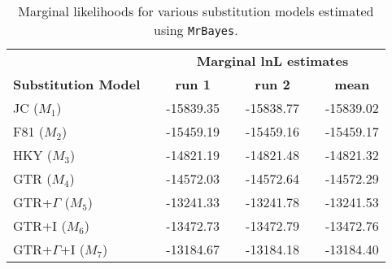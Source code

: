 %
\newpage
\begin{Form}
\begin{table}[h]
\centering
\caption{\small Marginal likelihoods for various substitution models estimated using \texttt{MrBayes}.}
\begin{tabular}{l c c c c c c}
\hline
\multicolumn{1}{l}{\textbf{ }} &\multicolumn{1}{r}{\textbf{ }} & \multicolumn{5}{c}{\textbf{Marginal lnL estimates}} \\ 
\cline{3-7}
\multicolumn{1}{l}{\textbf{Substitution Model}} & \multicolumn{1}{r}{\hspace{3mm}} & \multicolumn{1}{c}{\textbf{run 1}} & \multicolumn{1}{r}{\hspace{3mm}} & \multicolumn{1}{c}{\textbf{run 2}} & \multicolumn{1}{r}{\hspace{3mm}} & \multicolumn{1}{c}{\textbf{mean}} \\ 
\hline
JC ($M_1$) & \hspace{15mm} 					&-15839.35  		& \hspace{3mm} & -15838.77  		& \hspace{3mm} & -15839.02\\
\hline
F81 ($M_2$) & \hspace{15mm} 				& -15459.19   		& \hspace{3mm} & -15459.16 			& \hspace{3mm} &  -15459.17\\
\hline
HKY ($M_3$) & \hspace{15mm} 				&  -14821.19 		& \hspace{3mm} &  -14821.48  		& \hspace{3mm} & -14821.32 \\
\hline
GTR ($M_4$) & \hspace{15mm} 				& -14572.03  		& \hspace{3mm} &  -14572.64   		& \hspace{3mm} &  -14572.29\\
\hline
GTR+$\Gamma$ ($M_5$) & \hspace{15mm} 		& -13241.33  		& \hspace{3mm} & -13241.78   		& \hspace{3mm} & -13241.53 \\
\hline
GTR+I ($M_6$)  & \hspace{15mm} 				&-13472.73  		& \hspace{3mm} & -13472.79   		& \hspace{3mm} &  -13472.76\\
\hline
GTR+$\Gamma$+I ($M_7$) & \hspace{15mm} 	& -13184.67 		& \hspace{3mm} & -13184.18  		& \hspace{3mm} & -13184.40 \\
\hline
\hline
\end{tabular}
\label{tab:ml_cytb}
\end{table}
\end{Form}





